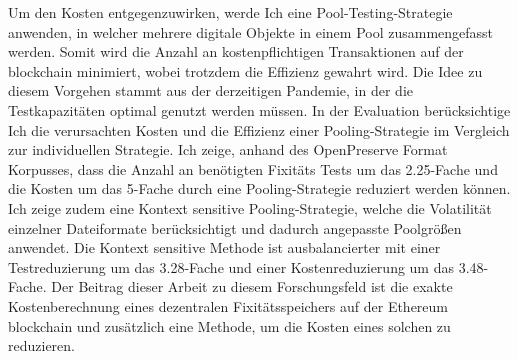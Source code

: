\documentclass[final]{vutinfth}
\providecommand{\DIFaddend}{} %
\begin{document}
\begin{kurzfassung}
{Um den Kosten entgegenzuwirken, werde Ich eine Pool-Testing-Strategie anwenden, in welcher mehrere digitale Objekte in einem Pool zusammengefasst werden. Somit wird die Anzahl an kostenpflichtigen Transaktionen auf der blockchain minimiert, wobei trotzdem die Effizienz gewahrt wird. Die Idee zu diesem Vorgehen stammt aus der derzeitigen Pandemie, in der die Testkapazitäten optimal genutzt werden müssen.
In der Evaluation berücksichtige Ich die verursachten Kosten und die Effizienz einer Pooling-Strategie im Vergleich zur individuellen Strategie. Ich zeige, anhand des OpenPreserve Format Korpusses, dass die Anzahl an benötigten Fixitäts Tests um das 2.25-Fache und die Kosten um das 5-Fache durch eine Pooling-Strategie reduziert werden können. Ich zeige zudem eine Kontext sensitive Pooling-Strategie, welche die Volatilität einzelner Dateiformate berücksichtigt und dadurch angepasste Poolgrößen anwendet. Die Kontext sensitive Methode ist ausbalancierter mit einer Testreduzierung um das 3.28-Fache und einer Kostenreduzierung um das 3.48-Fache.
Der Beitrag dieser Arbeit zu diesem Forschungsfeld ist die exakte Kostenberechnung eines dezentralen Fixitätsspeichers auf der Ethereum blockchain und zusätzlich eine Methode, um die Kosten eines solchen zu reduzieren.
}

 \DIFaddend \end{kurzfassung}
\end{document}
